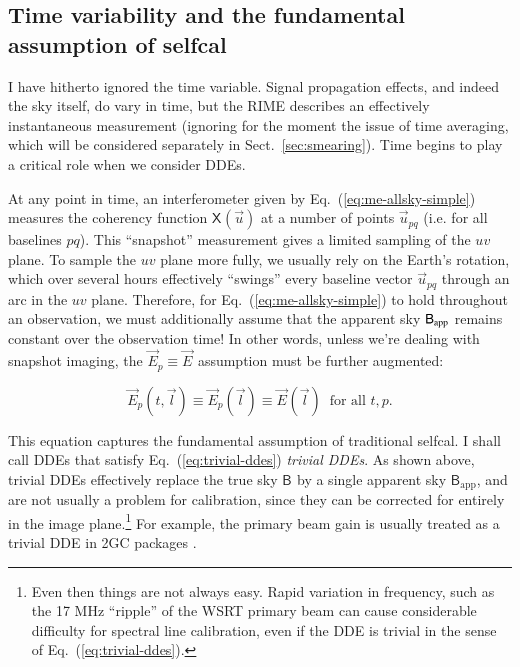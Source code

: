 \documentclass{aa}
\newcommand{\jones}[2]{\vec {#1}_{#2}}
\newcommand{\coh}[2]{\mathsf{{#1}}_{{#2}}}
\begin{document}
\subsection{Time variability and the fundamental assumption of selfcal\label{sec:timevar}}

I have hitherto ignored the time variable. Signal propagation effects, and indeed the sky itself, do vary in time, but the RIME describes an effectively instantaneous measurement (ignoring for the moment the issue of time averaging, which will be considered separately in Sect.~\ref{sec:smearing}). Time begins to play a critical role when we consider DDEs. 

At any point in time, an interferometer given by Eq.~(\ref{eq:me-allsky-simple}) measures the coherency function $\coh{X}{}(\vec u)$ at a number of points $\vec u_{pq}$ (i.e. for all baselines $pq$). This ``snapshot'' measurement gives a limited sampling of the $uv$ plane. To sample the $uv$ plane more fully, we usually rely on the Earth's rotation, which over several hours effectively ``swings'' every baseline vector $\vec u_{pq}$ through an arc in the $uv$ plane. Therefore, for Eq.~(\ref{eq:me-allsky-simple}) to hold throughout an observation, we must additionally assume that the apparent sky $\coh{B}{\rm app}$ remains constant over the observation time! In other words, unless we're dealing with snapshot imaging, the $\jones{E}{p}\equiv\jones{E}{}$ assumption must be further augmented:

\begin{equation}\label{eq:trivial-ddes}
\jones{E}{p}(t,\vec l) \equiv \jones{E}{p}(\vec l) \equiv \jones{E}{}(\vec l)\;\;\mbox{for all~} t,p. 
\end{equation}

This equation captures the fundamental assumption of traditional selfcal. I shall call DDEs that satisfy Eq.~(\ref{eq:trivial-ddes}) \emph{trivial DDEs}. As shown above, trivial DDEs effectively replace the true sky $\coh{B}{}$ by a single apparent sky $\coh{B}{\mathrm{app}}$, and are not usually a problem for calibration, since they can be corrected for entirely in the image plane.\footnote{Even then things are not always easy. Rapid variation in frequency, such as the 17 MHz ``ripple'' of the WSRT primary beam \citep[see Paper II,][Sect.~2.1.1]{RRIME2} can cause considerable difficulty for spectral line calibration, even if the DDE is trivial in the sense of Eq.~(\ref{eq:trivial-ddes}).}  For example, the primary beam gain is usually treated as a trivial DDE in 2GC packages \citep[see Paper II,][Sect.~2.1]{RRIME2}. 
\end{document}
